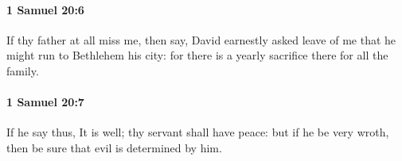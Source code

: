 		\paragraph{1 Samuel 20:6} %
			\label{1SAMUEL-20-6}

			If thy father at all miss me, then say, David earnestly asked leave of me that he might run to Bethlehem his city: for there is a yearly sacrifice there for all the family.


		\paragraph{1 Samuel 20:7} %
			\label{1SAMUEL-20-7}

			If he say thus, It is well; thy servant shall have peace: but if he be very wroth, then be sure that evil is determined by him.



